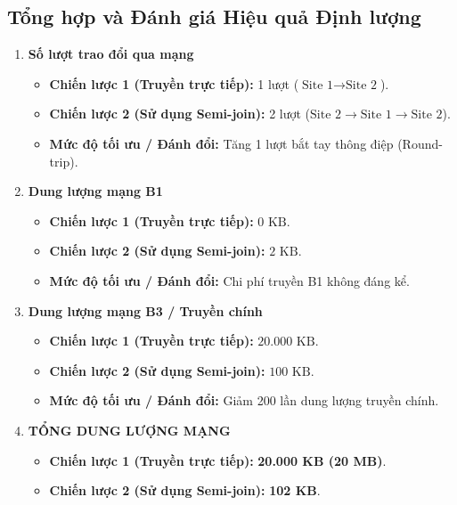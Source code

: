\documentclass[12pt,a4paper]{report}
\begin{document}
\subsection{Tổng hợp và Đánh giá Hiệu quả Định lượng}
\begin{enumerate}[leftmargin=0.8cm, topsep=1pt, itemsep=2pt]
    \item \textbf{Số lượt trao đổi qua mạng}
    \begin{itemize}[label=$\circ$, leftmargin=0.8cm, topsep=1pt, itemsep=1pt]
        \item \textbf{Chiến lược 1 (Truyền trực tiếp):} 1 lượt ($\text{Site 1} \rightarrow \text{Site 2}$).
        \item \textbf{Chiến lược 2 (Sử dụng Semi-join):} 2 lượt ($\text{Site 2} \rightarrow \text{Site 1} \rightarrow \text{Site 2}$).
        \item \textbf{Mức độ tối ưu / Đánh đổi:} Tăng 1 lượt bắt tay thông điệp (Round-trip).
    \end{itemize}
    \item \textbf{Dung lượng mạng B1}
    \begin{itemize}[label=$\circ$, leftmargin=0.8cm, topsep=1pt, itemsep=1pt]
        \item \textbf{Chiến lược 1 (Truyền trực tiếp):} $0\text{ KB}$.
        \item \textbf{Chiến lược 2 (Sử dụng Semi-join):} $2\text{ KB}$.
        \item \textbf{Mức độ tối ưu / Đánh đổi:} Chi phí truyền B1 không đáng kể.
    \end{itemize}
    \item \textbf{Dung lượng mạng B3 / Truyền chính}
    \begin{itemize}[label=$\circ$, leftmargin=0.8cm, topsep=1pt, itemsep=1pt]
        \item \textbf{Chiến lược 1 (Truyền trực tiếp):} $20.000\text{ KB}$.
        \item \textbf{Chiến lược 2 (Sử dụng Semi-join):} $100\text{ KB}$.
        \item \textbf{Mức độ tối ưu / Đánh đổi:} Giảm 200 lần dung lượng truyền chính.
    \end{itemize}
    \item \textbf{TỔNG DUNG LƯỢNG MẠNG}
    \begin{itemize}[label=$\circ$, leftmargin=0.8cm, topsep=1pt, itemsep=1pt]
        \item \textbf{Chiến lược 1 (Truyền trực tiếp):} \textbf{20.000 KB (20 MB)}.
        \item \textbf{Chiến lược 2 (Sử dụng Semi-join):} \textbf{102 KB}.

\end{itemize}
\end{enumerate}
\end{document}
